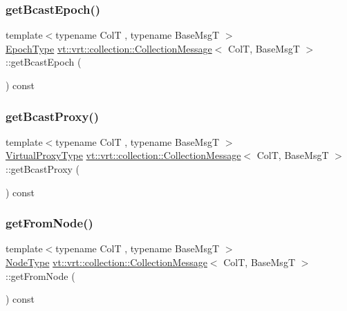 \subsubsection{\texorpdfstring{get\+Bcast\+Epoch()}{getBcastEpoch()}}
{\footnotesize\ttfamily template$<$typename ColT , typename Base\+MsgT $>$ \\
\hyperlink{namespacevt_a985a5adf291c34a3ca263b3378388236}{Epoch\+Type} \hyperlink{structvt_1_1vrt_1_1collection_1_1_collection_message}{vt\+::vrt\+::collection\+::\+Collection\+Message}$<$ ColT, Base\+MsgT $>$\+::get\+Bcast\+Epoch (\begin{DoxyParamCaption}{ }\end{DoxyParamCaption}) const}

\mbox{\label{structvt_1_1vrt_1_1collection_1_1_collection_message_a25c1d0924ade6a7e074fc419a75c8a71}} 
\subsubsection{\texorpdfstring{get\+Bcast\+Proxy()}{getBcastProxy()}}
{\footnotesize\ttfamily template$<$typename ColT , typename Base\+MsgT $>$ \\
\hyperlink{namespacevt_a1b417dd5d684f045bb58a0ede70045ac}{Virtual\+Proxy\+Type} \hyperlink{structvt_1_1vrt_1_1collection_1_1_collection_message}{vt\+::vrt\+::collection\+::\+Collection\+Message}$<$ ColT, Base\+MsgT $>$\+::get\+Bcast\+Proxy (\begin{DoxyParamCaption}{ }\end{DoxyParamCaption}) const}

\mbox{\label{structvt_1_1vrt_1_1collection_1_1_collection_message_a642d64890e3ef47a5561ceaede752181}} 
\subsubsection{\texorpdfstring{get\+From\+Node()}{getFromNode()}}
{\footnotesize\ttfamily template$<$typename ColT , typename Base\+MsgT $>$ \\
\hyperlink{namespacevt_a866da9d0efc19c0a1ce79e9e492f47e2}{Node\+Type} \hyperlink{structvt_1_1vrt_1_1collection_1_1_collection_message}{vt\+::vrt\+::collection\+::\+Collection\+Message}$<$ ColT, Base\+MsgT $>$\+::get\+From\+Node (\begin{DoxyParamCaption}{ }\end{DoxyParamCaption}) const}

